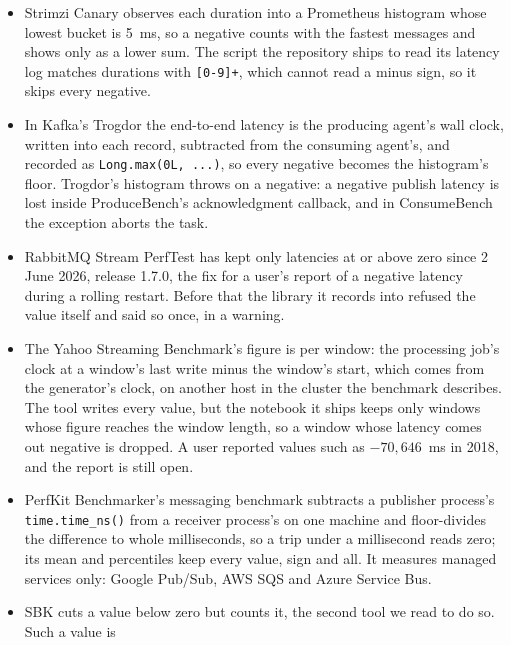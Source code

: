 \documentclass[10pt,journal,onecolumn]{IEEEtran}
\newcommand{\kafka}{Kafka}
\begin{document}
\begin{itemize}
library its build pins, \texttt{kafka-clients} 2.8.2, whose percentile statistic has a floor of
zero and pins a value below it to the floor: a negative latency enters its 99th and higher
percentiles as zero, logged only at debug level, while its average keeps it. Its producer and
consumer are two services of one process by default and can run as separate processes.
\item Strimzi Canary observes each duration into a Prometheus histogram whose lowest bucket is
5~ms, so a negative counts with the fastest messages and shows only as a lower sum. The script the
repository ships to read its latency log matches durations with \texttt{[0-9]+}, which cannot read
a minus sign, so it skips every negative.
\item In \kafka{}'s Trogdor the end-to-end latency is the producing agent's wall clock, written
into each record, subtracted from the consuming agent's, and recorded as \texttt{Long.max(0L,
...)}, so every negative becomes the histogram's floor. Trogdor's histogram throws on a negative:
a negative publish latency is lost inside ProduceBench's acknowledgment callback, and in
ConsumeBench the exception aborts the task.
\item RabbitMQ Stream PerfTest has kept only latencies at or above zero since 2 June 2026, release
1.7.0, the fix for a user's report of a negative latency during a rolling restart. Before that the
library it records into refused the value itself and said so once, in a warning.
\item The Yahoo Streaming Benchmark's figure is per window: the processing job's clock at a
window's last write minus the window's start, which comes from the generator's clock, on another
host in the cluster the benchmark describes. The tool writes every value, but the notebook it
ships keeps only windows whose figure reaches the window length, so a window whose latency comes
out negative is dropped. A user reported values such as $-70{,}646$~ms in 2018, and the report is
still open.
\item PerfKit Benchmarker's messaging benchmark subtracts a publisher process's
\texttt{time.time\_ns()} from a receiver process's on one machine and floor-divides the difference
to whole milliseconds, so a trip under a millisecond reads zero; its mean and percentiles keep
every value, sign and all. It measures managed services only: Google Pub/Sub, AWS SQS and Azure
Service Bus.
\item SBK cuts a value below zero but counts it, the second tool we read to do so. Such a value is

\end{itemize}
\end{document}

